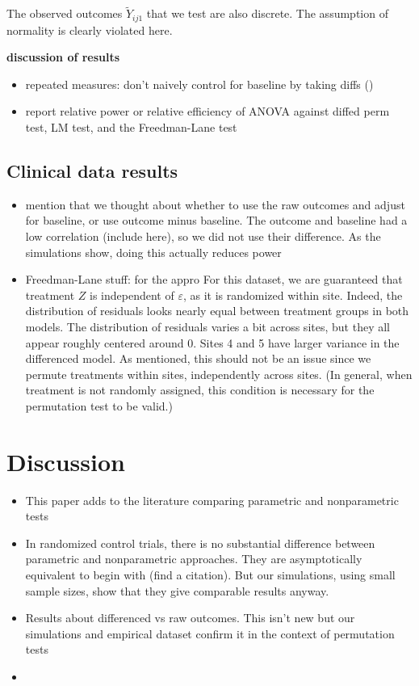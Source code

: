 \documentclass[11pt]{article}
\newcommand{\bit}{\begin{itemize}}
\newcommand{\eit}{\end{itemize}}
\newcommand{\todo}[1]{{\color{red}{TO DO: \sc #1}}}
\begin{document}
The observed outcomes $\tilde{Y}_{ij1}$ that we test are also discrete.
The assumption of normality is clearly violated here.

\todo{Summary of results for skewed sims}


\textbf{discussion of results}
 \bit
\item repeated measures: don't naively control for baseline by taking diffs (\cite{frison_repeated_1992})
\item report relative power or relative efficiency of ANOVA against diffed perm test, LM test, and the Freedman-Lane test
\eit


\subsection{Clinical data results}

\bit
\item mention that we thought about whether to use the raw outcomes and adjust for baseline, or use outcome minus baseline. The outcome and baseline had a low correlation (include here), so we did not use their difference. As the simulations show, doing this actually reduces power
\item Freedman-Lane stuff: for the appro
For this dataset, we are guaranteed that treatment $Z$ is independent of $\varepsilon$, as it is randomized within site.
Indeed, the distribution of residuals looks nearly equal between treatment groups in both models.
The distribution of residuals varies a bit across sites, but they all appear roughly centered around 0.
Sites 4 and 5 have larger variance in the differenced model.
As mentioned, this should not be an issue since we permute treatments within sites, independently across sites.
(In general, when treatment is not randomly assigned, this condition is necessary for the permutation test to be valid.)
\eit


\section{Discussion}

\bit
\item This paper adds to the literature comparing parametric and nonparametric tests
\item In randomized control trials, there is no substantial difference between parametric and nonparametric approaches.  They are asymptotically equivalent to begin with (find a citation). But our simulations, using small sample sizes, show that they give comparable results anyway.
\item Results about differenced vs raw outcomes. This isn't new but our simulations and empirical dataset confirm it in the context of permutation tests
\item 
\eit
\end{document}
